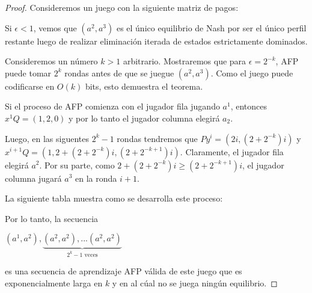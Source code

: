 \documentclass{article}
\begin{document}
\begin{proof}
    Consideremos un juego con la siguiente matriz de pagos:

    

    Si $\epsilon < 1$, vemos que $(a^2, a^3)$ es el único
    equilibrio de Nash por ser el único perfil restante luego de realizar eliminación iterada de estados estrictamente dominados.

    Consideremos un número $k > 1$ arbitrario. Mostraremos que para $\epsilon = 2^{-k}$, AFP puede tomar $2^k$ rondas antes de que
    se juegue $(a^2, a^3)$. Como el juego puede codificarse en $O(k)$ bits, esto demuestra el teorema.

    Si el proceso de AFP comienza con el jugador fila jugando $a^1$, entonces $x^1Q = (1, 2, 0)$ y por lo tanto
    el jugador columna elegirá $a_2$.

    Luego, en las siguentes $2^k - 1$ rondas tendremos que $Py^i = (2i, (2+2^{-k})i)$ y $x^{i+1}Q = (1, 2+(2+2^{-k})i, (2+2^{-k+1})i)$.
    Claramente, el jugador fila elegirá $a^2$.
    Por su parte, como $2+(2+2^{-k})i \ge (2+2^{-k+1})i$, el jugador columna jugará $a^3$ en la ronda $i + 1$.

    La siguiente tabla muestra como se desarrolla este proceso:

    

    Por lo tanto, la secuencia

    \begin{center}
    \begin{math}
        (a^1, a^2), \underbrace{(a^2, a^2), ... (a^2, a^2)}_{\text{$2^k - 1$ veces}}
    \end{math}
    \end{center}

    es una secuencia de aprendizaje AFP válida de este juego que es exponencialmente larga en $k$ y en al cúal no se juega ningún equilibrio.

\end{proof}
\end{document}
